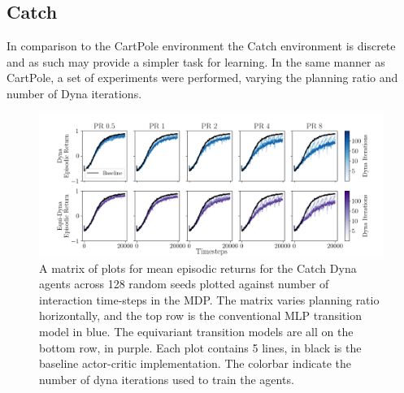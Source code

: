 \subsection{Catch}
In comparison to the CartPole environment the Catch environment is discrete and as such may provide a simpler task for learning.
In the same manner as CartPole, a set of experiments were performed, varying the planning ratio and number of Dyna iterations.
\begin{figure}
	\centering
	\includegraphics[width=\textwidth]{Figures/dyna_sweep_catch.png}
	\caption{A matrix of plots for mean episodic returns for the Catch Dyna agents across 128 random seeds
		plotted against number of interaction time-steps in the MDP. The matrix varies planning ratio horizontally, and the top row is the conventional MLP transition model in blue. The equivariant transition models are all on the bottom row, in purple. Each plot contains 5 lines, in black is the baseline actor-critic implementation. The colorbar indicate the number of dyna iterations used to train the agents.}
	\label{fig:catch_dyna}
\end{figure}

